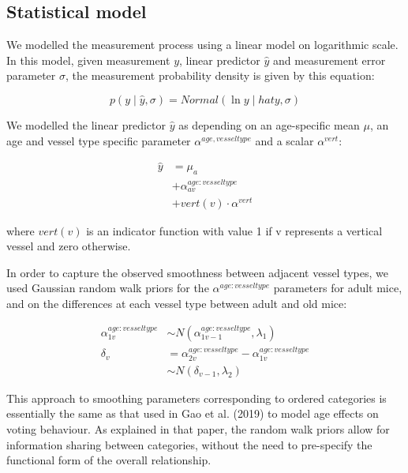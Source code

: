 \documentclass[
  letterpaper,
  DIV=11,
  numbers=noendperiod,
  oneside]{scrartcl}
\theoremstyle{plain}
\theoremstyle{remark}
\begin{document}
\subsection{Statistical model}\label{statistical-model-1}

We modelled the measurement process using a linear model on logarithmic
scale. In this model, given measurement \(y\), linear predictor
\(\hat{y}\) and measurement error parameter \(\sigma\), the measurement
probability density is given by this equation:

\begin{equation}
  p(y\mid\hat{y}, \sigma) = Normal(\ln{y}\mid hat{y}, \sigma) \label{eq:measurement-model-density}
\end{equation}

We modelled the linear predictor \(\hat{y}\) as depending on an
age-specific mean \(\mu\), an age and vessel type specific parameter
\(\alpha^{age,vessel type}\) and a scalar \(\alpha^{vert}\):

\begin{align}
  \hat{y} &= \mu_a \label{eq:density-measurement-model} \\
          &+ \alpha^{age:vesseltype}_{av} \nonumber \\ 
          &+ vert(v) \cdot \alpha^{vert} \nonumber
\end{align}

where \(vert(v)\) is an indicator function with value 1 if v represents
a vertical vessel and zero otherwise.

In order to capture the observed smoothness between adjacent vessel
types, we used Gaussian random walk priors for the
\(\alpha^{age:vesseltype}\) parameters for adult mice, and on the
differences at each vessel type between adult and old mice:

\begin{align}
  \alpha^{age:vesseltype}_{1v} &\sim N(\alpha^{age:vesseltype}_{1v-1}, \lambda_1)\label{eq:smooth} \\
  \delta_v &= \alpha^{age:vesseltype}_{2v} - \alpha^{age:vesseltype}_{1v} \nonumber \\
         &\sim N(\delta_{v-1}, \lambda_2) \nonumber
\end{align}

This approach to smoothing parameters corresponding to ordered
categories is essentially the same as that used in Gao et al. (2019) to
model age effects on voting behaviour. As explained in that paper, the
random walk priors allow for information sharing between categories,
without the need to pre-specify the functional form of the overall
relationship.
\end{document}
